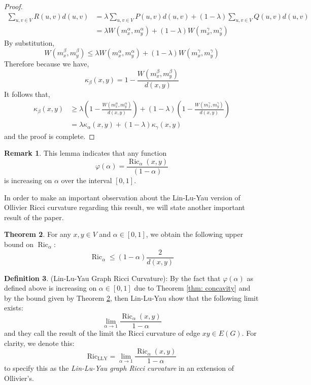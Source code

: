 \documentclass{Dissertate}
\theoremstyle{definition}
\newtheorem{theorem}{Theorem}[section]
\theoremstyle{definition} %
\theoremstyle{definition}
\newtheorem{definition}[theorem]{Definition}
\newtheorem{remark}[theorem]{Remark}
\begin{document}
\begin{proof}
\begin{align*}
\sum_{u, v \in V} R(u, v) d(u,v)  
&= \lambda \sum_{u,v \in V} P(u, v) d(u, v) + (1 - \lambda) \sum_{u,v \in V} Q(u, v) d(u, v) \\
&= \lambda W(m_x^\alpha, m_y^\alpha) + (1 - \lambda) W(m_x^\gamma, m_y^\gamma)
\end{align*}
By substitution, 
$$
W(m_x^\beta, m_y^\beta) \leq \lambda W(m_x^\alpha, m_y^\alpha) + (1 - \lambda) W(m_x^\gamma, m_y^\gamma)
$$
Therefore because we have, 
$$
\kappa_\beta(x, y) = 1 - \frac{W(m_x^\beta, m_y^\beta)}{d(x, y)} 
$$
It follows that, 
\begin{align*}
\kappa_\beta(x, y) &\geq \lambda \left( 1 - \frac{W(m_x^\alpha, m_y^\alpha)}{d(x, y)} \right) + (1 - \lambda) \left( 1 - \frac{W(m_x^\gamma, m_y^\gamma)}{d(x, y)} \right) \\
&= \lambda \kappa_\alpha(x, y) + (1 - \lambda) \kappa_\gamma(x, y)
\end{align*}
and the proof is complete. 
\end{proof}
\begin{remark} 
This lemma indicates that any function
$$
\varphi(\alpha) = \frac{\operatorname{Ric}_\alpha(x,y)}{(1-\alpha)}
$$
is increasing on $\alpha$ over the interval $[0,1]$. 
\end{remark}
In order to make an important observation about the Lin-Lu-Yau version of Ollivier Ricci curvature regarding this result, we will state another important result of the paper. 
\begin{theorem} \label{yau-bound1} For any $x,y \in V$ and $\alpha \in [0,1]$, we obtain the following upper bound on $\operatorname{Ric}_\alpha$:
$$
\operatorname{Ric}_\alpha \leq (1- \alpha) \frac{2}{d(x,y)}
$$
\end{theorem}

\begin{definition} \label{def: lin lu yau notion} (Lin-Lu-Yau Graph Ricci Curvature): By the fact that $\varphi(\alpha)$ as defined above is increasing on $\alpha \in [0,1]$ due to Theorem \ref{thm: concavity} and by the bound given by Theorem \ref{yau-bound1}, then Lin-Lu-Yau show that the following limit exists: 
$$
\lim_{\alpha \to 1} \frac{\operatorname{Ric}_\alpha(x, y)}{1 - \alpha}
$$
and they call the result of the limit the Ricci curvature of edge $xy \in E(G)$. For clarity, we denote this: 
$$
\operatorname{Ric_{LLY}} = \lim_{\alpha \to 1} \frac{\operatorname{Ric}_\alpha(x, y)}{1 - \alpha}
$$
to specify this as the \textit{Lin-Lu-Yau graph Ricci curvature} in an extension of Ollivier's. 
\end{definition}
\end{document}
